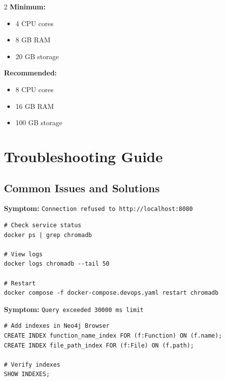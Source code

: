 \documentclass[11pt,letterpaper,twoside]{article}
\begin{document}
\begin{componentbox}
\begin{multicols}{2}
\textbf{Minimum:}
\begin{itemize}[leftmargin=1em]
    \item 4 CPU cores
    \item 8 GB RAM
    \item 20 GB storage
\end{itemize}

\columnbreak

\textbf{Recommended:}
\begin{itemize}[leftmargin=1em]
    \item 8 CPU cores
    \item 16 GB RAM
    \item 100 GB storage
\end{itemize}
\end{multicols}
\end{componentbox}

\newpage
\section{Troubleshooting Guide}

\subsection{Common Issues and Solutions}

\begin{componentbox}
\textbf{Symptom:} \texttt{Connection refused to http://localhost:8080}

\begin{lstlisting}[style=bashstyle]
# Check service status
docker ps | grep chromadb

# View logs
docker logs chromadb --tail 50

# Restart
docker compose -f docker-compose.devops.yaml restart chromadb
\end{lstlisting}
\end{componentbox}

\begin{componentbox}
\textbf{Symptom:} \texttt{Query exceeded 30000 ms limit}

\begin{lstlisting}[style=bashstyle]
# Add indexes in Neo4j Browser
CREATE INDEX function_name_index FOR (f:Function) ON (f.name);
CREATE INDEX file_path_index FOR (f:File) ON (f.path);

# Verify indexes
SHOW INDEXES;
\end{lstlisting}
\end{componentbox}
\end{document}
